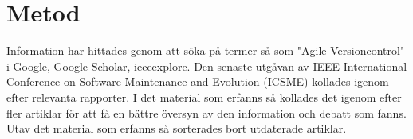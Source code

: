 \section{Metod}
\label{sec:bjorn-method}

Information har hittades genom att söka på termer så som "Agile Versioncontrol" i Google, Google Scholar, ieeeexplore. Den senaste utgåvan av IEEE International Conference on Software Maintenance and Evolution (ICSME) kollades igenom efter relevanta rapporter. I det material som erfanns så kollades det igenom efter fler artiklar för att få en bättre översyn av den information och debatt som fanns. Utav det material som erfanns så sorterades bort utdaterade artiklar.
